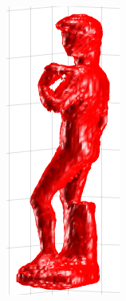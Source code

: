 \documentclass[paper=a4, fontsize=11pt]{scrartcl} %
\numberwithin{equation}{section} %
\numberwithin{figure}{section} %
\numberwithin{table}{section} %
\begin{document}
\begin{figure}
\begin{subfigure}{.3\textwidth}
\end{subfigure}%
\begin{subfigure}{.3\textwidth}
  \centering
  \includegraphics[width=0.9\linewidth]{david_2.png}

\end{subfigure}
\end{figure}
\end{document}
